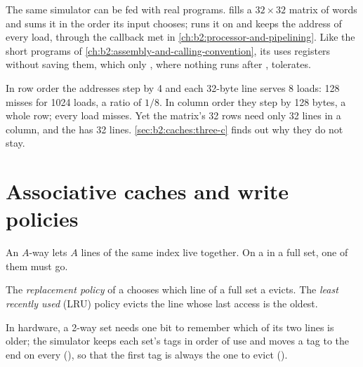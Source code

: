 The same simulator can be fed with real programs.  fills a $32 \times 32$ matrix of words and
sums it in the order its input chooses;  runs it on  and keeps the address of every
load, through the  callback met in \cref{ch:b2:processor-and-pipelining}. Like the short programs of
\cref{ch:b2:assembly-and-calling-convention}, its  uses  registers without saving them, which only
, where nothing runs after , tolerates.



\label{out:b2:caches:trace}

In row order the addresses step by 4 and each 32-byte line serves 8 loads: 128 misses for 1024 loads, a  ratio
of $1/8$. In column order they step by 128 bytes, a whole row; every load misses. Yet the matrix's 32 rows need only
32 lines in a column, and the  has 32 lines. \cref{sec:b2:caches:three-c} finds out why they do not stay.

\section{Associative caches and write policies}\label{sec:b2:caches:associative}

An $A$-way  lets $A$ lines of the same index live together. On a  in a full set, one of them must go.

\begin{definition}\label{def:b2:caches:lru}
The \emph{replacement policy} of a  chooses which line of a full set
a  evicts. The \emph{least recently used} (LRU) policy evicts the line whose last
access is the oldest.
\end{definition}

In hardware, a 2-way set needs one bit to remember which of its two lines is older; the simulator keeps each set's
tags in order of use and moves a tag to the end on every  (), so that the first tag is always
the one to evict ().

